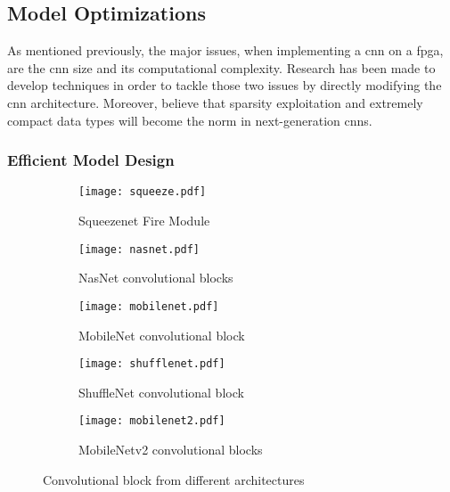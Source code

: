 \subsection{Model Optimizations} \label{subsec:mdopti}
As mentioned previously, the major issues, when implementing a \acrshort{cnn} on a \acrshort{fpga}, are the \acrshort{cnn} size and its computational complexity. Research has been made to develop techniques in order to tackle those two issues by directly modifying the \acrshort{cnn} architecture. Moreover, \textcite{nurvitadhi_can_2017} believe that sparsity exploitation and extremely compact data types will become the norm in next-generation \acrshort{cnn}s.
%
%
\subsubsection{Efficient Model Design}
%
\begin{figure}
    \centering
    \begin{subfigure}{0.49\linewidth}
        \centering
        \texttt{[image: squeeze.pdf]}
        \caption{Squeezenet Fire Module\cite{iandola_squeezenet_2016}}
        \label{fig:archi_building_block:sqn}
    \end{subfigure}
    \begin{subfigure}{0.49\linewidth}
        \centering
        \texttt{[image: nasnet.pdf]}
        \caption{NasNet convolutional blocks \cite{zoph_learning_2018}}
        \label{fig:archi_building_block:nasn}
    \end{subfigure}
    \begin{subfigure}{0.49\linewidth}
        \centering
        \texttt{[image: mobilenet.pdf]}
        \caption{MobileNet convolutional block \cite{howard_mobilenets_2017}}
        \label{fig:archi_building_block:mbn}
    \end{subfigure}
    \begin{subfigure}{0.49\linewidth}
        \centering
        \texttt{[image: shufflenet.pdf]}
        \caption{ShuffleNet convolutional block \cite{zhang_shufflenet_2018}}
        \label{fig:archi_building_block:shn}
    \end{subfigure}
    \begin{subfigure}{0.49\linewidth}
        \centering
        \texttt{[image: mobilenet2.pdf]}
        \caption{MobileNetv2 convolutional blocks \cite{sandler_mobilenetv2_2019}}
        \label{fig:archi_building_block:mb2n}
    \end{subfigure}
    \caption{Convolutional block from different architectures}
    \label{fig:archi_building_block}
\end{figure}
